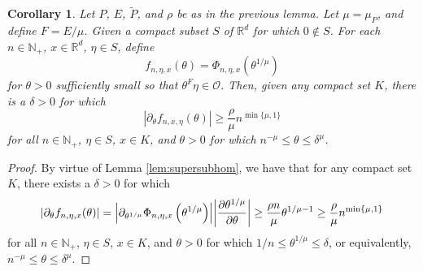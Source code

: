 \documentclass[11pt]{article}
\newtheorem{corollary}[theorem]{Corollary}
\newcommand{\p}{\partial}
\newcommand{\f}[2]{\frac{#1}{#2}}
\begin{document}
\begin{corollary}\label{cor:supersubhom_NEW}
Let $P$, $E$, $\widetilde{P}$, and $\rho$ be as in the previous lemma.  Let $\mu=\mu_P$, and define $F=E/\mu$. Given a compact subset $S$ of $\mathbb{R}^d$ for which $0\notin S$. For each $n\in\mathbb{N}_+$, $x\in\mathbb{R}^d$, $\eta\in S$, define
\begin{equation*}
f_{n,\eta,x}(\theta)=\Phi_{n,\eta,x}\left(\theta^{1/\mu}\right)
\end{equation*}
for $\theta>0$ sufficiently small so that $\theta^F\eta\in\mathcal{O}$. Then, given any compact set $K$, there is a $\delta>0$ for which
\begin{equation*}
    |\partial_\theta f_{n,x,\eta}(\theta)|\geq \frac{\rho}{\mu} n^{\min\{\mu,1\}}
\end{equation*}
for all $n\in\mathbb{N}_+$, $\eta\in S$,  $x\in K$, and $\theta>0$ for which $n^{-\mu}\leq \theta\leq \delta^\mu$.
\end{corollary}
\begin{proof}
By virtue of Lemma \ref{lem:supersubhom}, we have that for any compact set $K$, there exists a $\delta > 0$ for which 
\begin{equation*}
    \abs{\p_\theta f_{n,\eta,x} (\theta)} = 
     \abs{  \p_{\theta^{1/\mu}} \Phi_{n,\eta,x}\left(\theta^{1/\mu}\right)}
     \abs{ \f{\p \theta^{1/\mu}}{\p \theta}} 
     \geq 
    \f{\rho n}{\mu}\theta^{1/\mu - 1}  \geq \f{\rho}{\mu}n^{\min\{\mu,1 \}}
\end{equation*}
for all $n\in \mathbb{N}_+$, $\eta \in S$, $x\in K$, and $\theta > 0$ for which $1/n \leq \theta^{1/\mu} \leq \delta$, or equivalently, $n^{-\mu} \leq \theta \leq \delta^\mu$. 
\end{proof}
\end{document}
